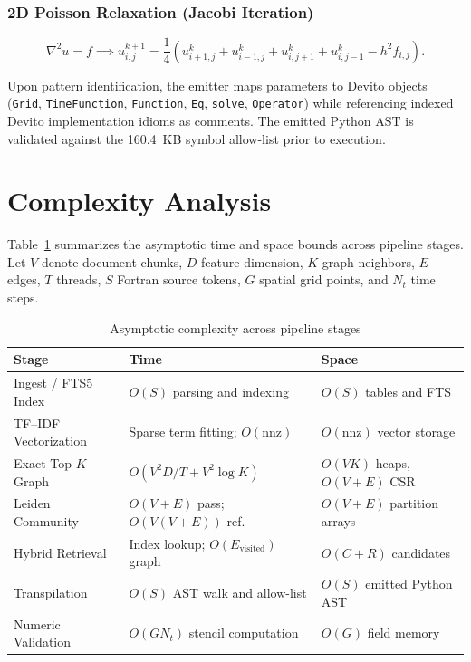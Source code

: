 \documentclass[conference]{IEEEtran}
\begin{document}
\subsubsection{2D Poisson Relaxation (Jacobi Iteration)}
\begin{equation}
\label{eq:poisson2d}
\nabla^2 u = f \implies u_{i,j}^{k+1} = \frac{1}{4}\left( u_{i+1,j}^k + u_{i-1,j}^k + u_{i,j+1}^k + u_{i,j-1}^k - h^2 f_{i,j} \right).
\end{equation}

Upon pattern identification, the emitter maps parameters to Devito objects (\texttt{Grid}, \texttt{TimeFunction}, \texttt{Function}, \texttt{Eq}, \texttt{solve}, \texttt{Operator}) while referencing indexed Devito implementation idioms as comments. The emitted Python AST is validated against the 160.4~KB symbol allow-list prior to execution.

\section{Complexity Analysis}
Table~\ref{tab:complexity} summarizes the asymptotic time and space bounds across pipeline stages. Let $V$ denote document chunks, $D$ feature dimension, $K$ graph neighbors, $E$ edges, $T$ threads, $S$ Fortran source tokens, $G$ spatial grid points, and $N_t$ time steps.

\begin{table}[!t]
\caption{Asymptotic complexity across pipeline stages}
\label{tab:complexity}\centering\footnotesize
\setlength{\tabcolsep}{3pt}
\begin{tabularx}{\columnwidth}{lXX}\toprule
Stage & Time & Space \\ \midrule
Ingest / FTS5 Index & $O(S)$ parsing and indexing & $O(S)$ tables and FTS \\
TF--IDF Vectorization & Sparse term fitting; $O(\mathrm{nnz})$ & $O(\mathrm{nnz})$ vector storage \\
Exact Top-$K$ Graph & $O(V^2 D / T + V^2 \log K)$ & $O(VK)$ heaps, $O(V+E)$ CSR \\
Leiden Community & $O(V+E)$ pass; $O(V(V+E))$ ref. & $O(V+E)$ partition arrays \\
Hybrid Retrieval & Index lookup; $O(E_{\mathrm{visited}})$ graph & $O(C+R)$ candidates \\
Transpilation & $O(S)$ AST walk and allow-list & $O(S)$ emitted Python AST \\
Numeric Validation & $O(G N_t)$ stencil computation & $O(G)$ field memory \\
\bottomrule\end{tabularx}
\end{table}
\end{document}
